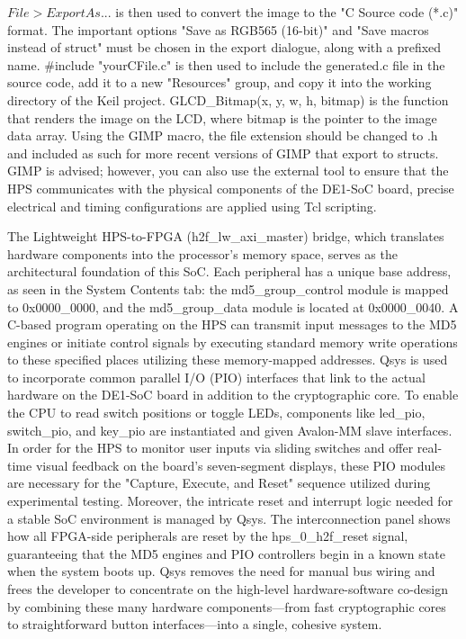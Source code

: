 \documentclass[conference]{IEEEtran}
\begin{document}
$File > Export As...$ is then used to convert the image to the "C Source code (*.c)" format. The important options "Save as RGB565 (16-bit)" and "Save macros instead of struct" must be chosen in the export dialogue, along with a prefixed name. \#include "yourCFile.c" is then used to include the generated.c file in the source code, add it to a new "Resources" group, and copy it into the working directory of the Keil project. GLCD\_Bitmap(x, y, w, h, bitmap) is the function that renders the image on the LCD, where bitmap is the pointer to the image data array. Using the GIMP macro, the file extension should be changed to .h and included as such for more recent versions of GIMP that export to structs. GIMP is advised; however, you can also use the external tool to ensure that the HPS communicates with the physical components of the DE1-SoC board, precise electrical and timing configurations are applied using Tcl scripting.

The Lightweight HPS-to-FPGA (h2f\_lw\_axi\_master) bridge, which translates hardware components into the processor's memory space, serves as the architectural foundation of this SoC. Each peripheral has a unique base address, as seen in the System Contents tab: the md5\_group\_control module is mapped to 0x0000\_0000, and the md5\_group\_data module is located at 0x0000\_0040. A C-based program operating on the HPS can transmit input messages to the MD5 engines or initiate control signals by executing standard memory write operations to these specified places utilizing these memory-mapped addresses.
Qsys is used to incorporate common parallel I/O (PIO) interfaces that link to the actual hardware on the DE1-SoC board in addition to the cryptographic core. To enable the CPU to read switch positions or toggle LEDs, components like led\_pio, switch\_pio, and key\_pio are instantiated and given Avalon-MM slave interfaces. In order for the HPS to monitor user inputs via sliding switches and offer real-time visual feedback on the board's seven-segment displays, these PIO modules are necessary for the "Capture, Execute, and Reset" sequence utilized during experimental testing.
Moreover, the intricate reset and interrupt logic needed for a stable SoC environment is managed by Qsys. The interconnection panel shows how all FPGA-side peripherals are reset by the hps\_0\_h2f\_reset signal, guaranteeing that the MD5 engines and PIO controllers begin in a known state when the system boots up. Qsys removes the need for manual bus wiring and frees the developer to concentrate on the high-level hardware-software co-design by combining these many hardware components—from fast cryptographic cores to straightforward button interfaces—into a single, cohesive system.
\end{document}
